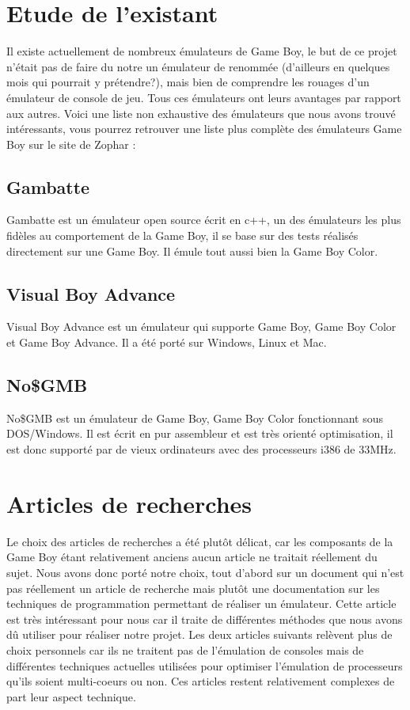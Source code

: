 \documentclass[french]{report}
\begin{document}
\section{Etude de l'existant}
Il existe actuellement de nombreux émulateurs de Game Boy, le but de ce projet n'était pas de faire du notre un émulateur de renommée (d'ailleurs en quelques mois qui pourrait y prétendre?), mais bien de comprendre les rouages d'un émulateur de console de jeu.
Tous ces émulateurs ont leurs avantages par rapport aux autres. Voici une liste non exhaustive des émulateurs que nous avons trouvé intéressants, vous pourrez retrouver une liste plus complète des émulateurs Game Boy sur le site de Zophar \cite{zophar}:

\subsection{Gambatte}
Gambatte \cite{gambatte} est un émulateur open source écrit en c++, un des émulateurs les plus fidèles au comportement de la Game Boy, il se base sur des tests réalisés directement sur une Game Boy. Il émule tout aussi bien la Game Boy Color.
\subsection{Visual Boy Advance}
Visual Boy Advance \cite{visualboyadv} est un émulateur qui supporte Game Boy, Game Boy Color et Game Boy Advance. Il a été porté sur Windows, Linux et Mac.
\subsection{No\$GMB}
No\$GMB \cite{nogmb} est un émulateur de Game Boy, Game Boy Color fonctionnant sous DOS/Windows. Il est écrit en pur assembleur et est très orienté optimisation, il est donc supporté par de vieux ordinateurs avec des processeurs i386 de 33MHz.
\section{Articles de recherches}
Le choix des articles de recherches a été plutôt délicat, car les composants de la Game Boy étant relativement anciens aucun article ne traitait réellement du sujet. Nous avons donc porté notre choix, tout d'abord sur un document qui n'est pas réellement un article de recherche mais plutôt une documentation sur les techniques de programmation permettant de réaliser un émulateur. Cette article est très intéressant pour nous car il traite de différentes méthodes que nous avons dû utiliser pour réaliser notre projet. Les deux articles suivants relèvent plus de choix personnels car ils ne traitent pas de l'émulation de consoles mais de différentes techniques actuelles utilisées pour optimiser l'émulation de processeurs qu'ils soient multi-coeurs ou non. Ces articles restent relativement complexes de part leur aspect technique.
\end{document}
